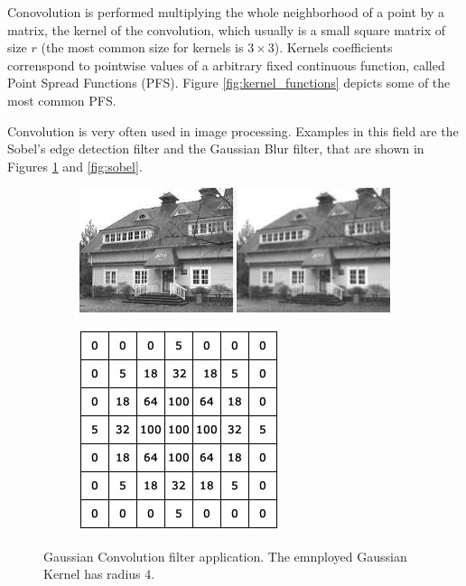 Conovolution is performed multiplying the whole neighborhood of a point by a  matrix, the kernel of the convolution, which usually is a small square matrix of size $r$ (the most common size for kernels is $3\times 3$).
Kernels coefficients correnspond to pointwise values of a arbitrary fixed continuous function, called Point Spread Functions (PFS). Figure \ref{fig:kernel_functions} depicts some of the most common PFS.

Convolution is very often used in image processing. Examples in this field are the Sobel's edge detection filter and the Gaussian Blur filter, that are shown in Figures \ref{fig:gaussian} and \ref{fig:sobel}.


\begin{figure}
	\begin{subfigure}{1.0\textwidth}
		\includegraphics[width=\linewidth]{./images/opencal/gaussian_example}
		
			
	\end{subfigure}
	
	\endminipage\hfill
	\begin{subfigure}{0.9\textwidth}
		\includegraphics[width=\linewidth]{./images/opencal/conv-gaussian-blur}	
	\end{subfigure}
	\endminipage\hfill
	\caption{Gaussian Convolution filter application. The emnployed Gaussian Kernel has radius $4$.}
	\label{fig:gaussian}
\end{figure}


